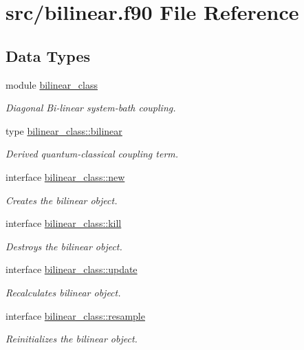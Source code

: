 \hypertarget{bilinear_8f90}{\section{src/bilinear.f90 File Reference}
\label{bilinear_8f90}
}
\subsection*{Data Types}
\begin{DoxyCompactItemize}
\item 
module \hyperlink{classbilinear__class}{bilinear\-\_\-class}
\begin{DoxyCompactList}\small\item\em Diagonal Bi-\/linear system-\/bath coupling. \end{DoxyCompactList}\item 
type \hyperlink{structbilinear__class_1_1bilinear}{bilinear\-\_\-class\-::bilinear}
\begin{DoxyCompactList}\small\item\em Derived quantum-\/classical coupling term. \end{DoxyCompactList}\item 
interface \hyperlink{interfacebilinear__class_1_1new}{bilinear\-\_\-class\-::new}
\begin{DoxyCompactList}\small\item\em Creates the bilinear object. \end{DoxyCompactList}\item 
interface \hyperlink{interfacebilinear__class_1_1kill}{bilinear\-\_\-class\-::kill}
\begin{DoxyCompactList}\small\item\em Destroys the bilinear object. \end{DoxyCompactList}\item 
interface \hyperlink{interfacebilinear__class_1_1update}{bilinear\-\_\-class\-::update}
\begin{DoxyCompactList}\small\item\em Recalculates bilinear object. \end{DoxyCompactList}\item 
interface \hyperlink{interfacebilinear__class_1_1resample}{bilinear\-\_\-class\-::resample}
\begin{DoxyCompactList}\small\item\em Reinitializes the bilinear object. \end{DoxyCompactList}\item 

\end{DoxyCompactItemize}
